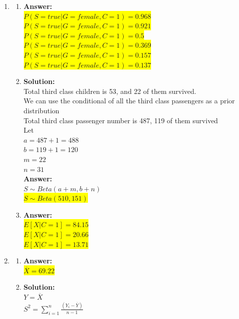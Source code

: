 \documentclass{article}
\newcommand{\myansw}{\textbf{Answer:}\\}
\newcommand{\mysolu}{\textbf{Solution:}\\}
\begin{document}
\begin{enumerate}
\begin{enumerate}
	\end{enumerate}
	\item
	\begin{enumerate}
		\item
		\myansw
		\colorbox{yellow}{$P(S = true|G = female, C= 1) = 0.968$}\\
		\colorbox{yellow}{$P(S = true|G = female, C= 1) = 0.921$}\\
		\colorbox{yellow}{$P(S = true|G = female, C= 1) = 0.5$}\\
		\colorbox{yellow}{$P(S = true|G = female, C= 1) = 0.369$}\\
		\colorbox{yellow}{$P(S = true|G = female, C= 1) = 0.157$}\\
		\colorbox{yellow}{$P(S = true|G = female, C= 1) = 0.137$}\\
		\item
		\mysolu
		Total third class children is 53, and 22 of them survived.\\
		We can use the conditional of all the third class passengers as a prior distribution\\
		Total third class passenger number is 487, 119 of them survived\\
		Let\\
		$a = 487 + 1 = 488$\\
		$b = 119 + 1 = 120$\\
		$m = 22$\\
		$n = 31$\\
		\myansw
		$S \sim Beta(a+m, b+n)$\\
		\colorbox{yellow}{$S \sim Beta(510, 151)$}\\
		\item
		\myansw
		\colorbox{yellow}{$E[X|C=1]= 84.15$}\\
		\colorbox{yellow}{$E[X|C=1]= 20.66$}\\
		\colorbox{yellow}{$E[X|C=1]= 13.71$}\\

		
	\end{enumerate}
	\item
	\begin{enumerate}
		\item
		\myansw
		\colorbox{yellow}{$\overline{X} = 69.22$}\\
		\item
		\mysolu
		$Y = \overline{X}$\\
		$S^2 = \sum\limits_{i = 1}^{n}\frac{(Y_i - \overline{Y})}{n-1}$\\
		

\end{enumerate}
\end{enumerate}
\end{document}
